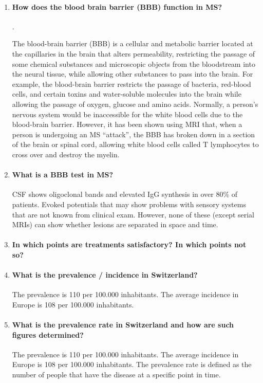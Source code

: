 \documentclass[12pt,article,oneside,a4paper]{memoir}
\begin{document}
\begin{enumerate}
\item \paragraph{How does the blood brain barrier (BBB) function in MS?}.

The blood-brain barrier (BBB) is a cellular and metabolic barrier located at
the capillaries in the brain that alters permeability, restricting the passage
of some chemical substances and microscopic objects from the bloodstream into
the neural tissue, while allowing other substances to pass into the brain. For
example, the blood-brain barrier restricts the passage of bacteria, red-blood
cells, and certain toxins and water-soluble molecules into the brain while
allowing the passage of oxygen, glucose and amino acids. Normally, a person's
nervous system would be inaccessible for the white blood cells due to the
blood-brain barrier. However, it has been shown using MRI that, when a person
is undergoing an MS ``attack'', the BBB has broken down in a section of the
brain or spinal cord, allowing white blood cells called T lymphocytes to cross
over and destroy the myelin. 

\item \paragraph{What is a BBB test in MS?}
CSF shows oligoclonal bands and elevated IgG synthesis in over 80\% of patients.
Evoked potentials that may show problems with sensory systems that are not
known from clinical exam. However, none of these (except serial MRIs) can show
whether lesions are separated in space and time.

\item \paragraph{In which points are treatments satisfactory?  In which points not so?}

\item \paragraph{What is the prevalence / incidence in Switzerland?}
The prevalence is 110 per 100.000 inhabitants. The average incidence in Europe
is 108 per 100.000 inhabitants.

\item \paragraph{What is the prevalence rate in Switzerland and how are such figures determined?}
The prevalence is 110 per 100.000 inhabitants. The average incidence in Europe
is 108 per 100.000 inhabitants. The prevalence rate is defined as the number of people that have the disease at a specific point in time.


\end{enumerate}
\end{document}
